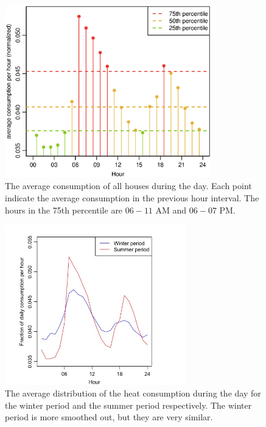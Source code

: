 \begin{figure}
    \centering
    \includegraphics[width=0.8\textwidth]{../../../figures/HourDistribution.eps}
    \caption{The average consumption of all houses during the day. Each point indicate the average consumption in the previous hour interval. The hours in the 75th percentile are $06-11$ AM and $06-07$ PM.}
    \label{fig:HourDistribution}
\end{figure}

\begin{figure}
    \centering
    \includegraphics[width=0.7\textwidth]{../../../figures/Season_distribution.jpeg}
    \caption{The average distribution of the heat consumption during the day for the winter period and the summer period respectively. The winter period is more smoothed out, but they are very similar.}
    \label{fig: Season_dist}
\end{figure}


